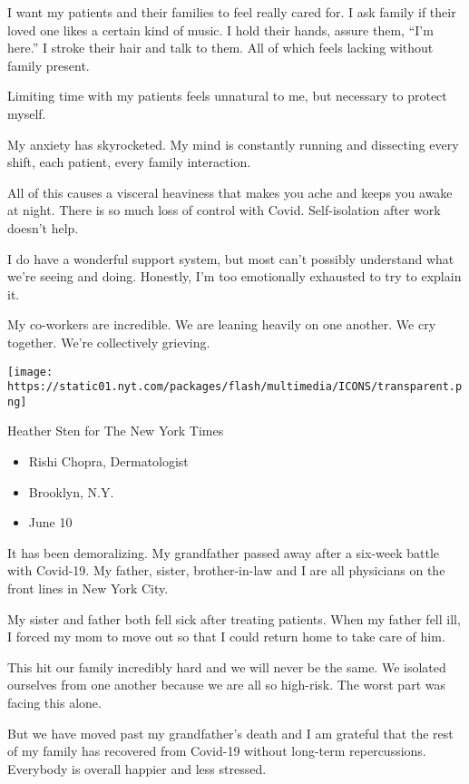 I want my patients and their families to feel really cared for. I ask
family if their loved one likes a certain kind of music. I hold their
hands, assure them, ``I'm here.'' I stroke their hair and talk to them.
All of which feels lacking without family present.

Limiting time with my patients feels unnatural to me, but necessary to
protect myself.

My anxiety has skyrocketed. My mind is constantly running and dissecting
every shift, each patient, every family interaction.

All of this causes a visceral heaviness that makes you ache and keeps
you awake at night. There is so much loss of control with Covid.
Self-isolation after work doesn't help.

I do have a wonderful support system, but most can't possibly understand
what we're seeing and doing. Honestly, I'm too emotionally exhausted to
try to explain it.

My co-workers are incredible. We are leaning heavily on one another. We
cry together. We're collectively grieving.

\texttt{[image: https://static01.nyt.com/packages/flash/multimedia/ICONS/transparent.png]}

Heather Sten for The New York Times

\begin{itemize}
\tightlist
\item
  Rishi Chopra, Dermatologist
\item
  Brooklyn, N.Y.
\item
  June 10
\end{itemize}

It has been demoralizing. My grandfather passed away after a six-week
battle with Covid-19. My father, sister, brother-in-law and I are all
physicians on the front lines in New York City.

My sister and father both fell sick after treating patients. When my
father fell ill, I forced my mom to move out so that I could return home
to take care of him.

This hit our family incredibly hard and we will never be the same. We
isolated ourselves from one another because we are all so high-risk. The
worst part was facing this alone.

But we have moved past my grandfather's death and I am grateful that the
rest of my family has recovered from Covid-19 without long-term
repercussions. Everybody is overall happier and less stressed.


